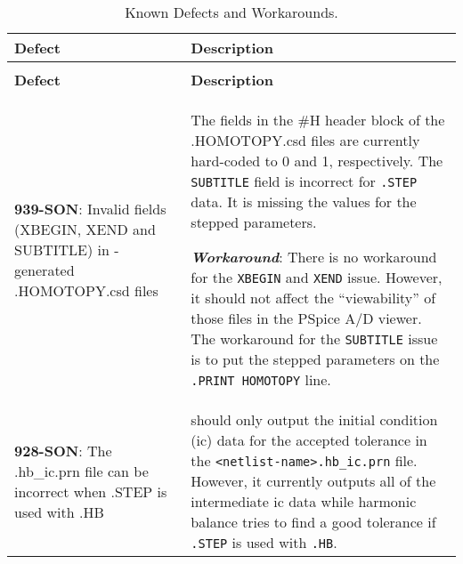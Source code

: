 




{
\small

\begin{longtable}[h] {>{\raggedright\small}m{2in}|>{\raggedright\let\\\tabularnewline\small}m{3.5in}}
  \caption{Known Defects and Workarounds.} \\ \hline
  \rowcolor{XyceDarkBlue} \color{white}\bf Defect & \color{white}\bf Description
  \\ \hline \endfirsthead
  \caption[]{Known Defects and Workarounds.} \\ \hline
  \rowcolor{XyceDarkBlue} \color{white}\bf Defect & \color{white}\bf Description
  \\ \hline \endhead

%
%
\textbf{939-SON}: Invalid fields (XBEGIN, XEND and SUBTITLE) in \Xyce{}-generated
.HOMOTOPY.csd files &  The  fields in the \#H header block of the .HOMOTOPY.csd
files are currently hard-coded to 0 and 1, respectively.  The \texttt{SUBTITLE} 
field is incorrect for \texttt{.STEP} data.  It is missing the values for the 
stepped parameters.

\textbf{\textit{Workaround}}: There is no workaround for the \texttt{XBEGIN} 
and \texttt{XEND} issue.  However, it should not affect the ``viewability'' of 
those files in the PSpice A/D viewer.  The workaround for the \texttt{SUBTITLE}
issue is to put the stepped parameters on the \texttt{.PRINT HOMOTOPY} line.
\\ \hline

\textbf{928-SON}: The .hb\_ic.prn file can be incorrect when .STEP is used 
with .HB &  \Xyce{} should only output the initial condition (ic) data for
the accepted tolerance in the \texttt{<netlist-name>.hb\_ic.prn} file.  
However, it currently outputs all of the intermediate ic data while harmonic 
balance tries to find a good tolerance if \texttt{.STEP} is used with 
\texttt{.HB}. 


\end{longtable}}
